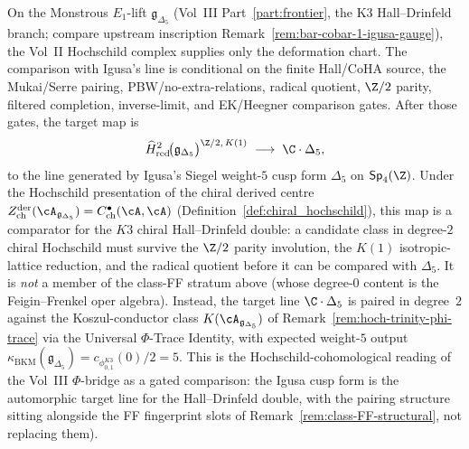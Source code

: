 \begin{remark}
\label{rem:hoch-igusa-gauge-class}
%
%
On the Monstrous $E_1$-lift
$\mathfrak{g}_{\Delta_5}$ (Vol~III Part~\ref{part:frontier},
the K3 Hall--Drinfeld branch; compare upstream inscription
Remark~\ref{rem:bar-cobar-1-igusa-gauge}), the Vol~II Hochschild
complex supplies only the deformation chart. The comparison with
Igusa's line is conditional on the finite Hall/CoHA source, the
Mukai/Serre pairing, PBW/no-extra-relations, radical quotient,
$\Z/2$ parity, filtered completion, inverse-limit, and EK/Heegner
comparison gates. After those gates, the target map is
\[
\widehat H^2_{\mathrm{red}}\!
  \bigl(\mathfrak{g}_{\Delta_5}\bigr)^{\Z/2,\,K(1)}
\;\longrightarrow\;
\C\cdot\Delta_5,
\]
to the line generated by Igusa's Siegel weight-$5$ cusp form
$\Delta_5$ on $\mathsf{Sp}_4(\Z)$. Under the Hochschild presentation
of the chiral derived centre
$Z^{\mathrm{der}}_{\mathrm{ch}}(\cA_{\mathfrak{g}_{\Delta_5}})
=C^\bullet_{\mathrm{ch}}(\cA,\cA)$
(Definition~\ref{def:chiral_hochschild}), this map is a comparator for
the $K3$ chiral Hall--Drinfeld double: a candidate class in
degree-$2$ chiral Hochschild must survive the $\Z/2$ parity involution,
the $K(1)$ isotropic-lattice reduction, and the radical quotient before
it can be compared with $\Delta_5$. It is \emph{not} a member of the
class-FF stratum above (whose degree-$0$ content is the
Feigin--Frenkel oper algebra). Instead, the target line
$\C\cdot\Delta_5$ is paired in degree~$2$ against the
Koszul-conductor class
$K(\cA_{\mathfrak{g}_{\Delta_5}})$ of
Remark~\ref{rem:hoch-trinity-phi-trace} via the Universal
$\Phi$-Trace Identity, with expected weight-$5$ output
$\kappa_{\mathrm{BKM}}(\mathfrak{g}_{\Delta_5})=c_{\phi_{0,1}^{K3}}(0)/2=5$.
This is the Hochschild-cohomological reading of the Vol~III
$\Phi$-bridge as a gated comparison: the Igusa cusp form is the
automorphic target line for the Hall--Drinfeld double, with the pairing
structure sitting alongside the FF fingerprint slots of
Remark~\ref{rem:class-FF-structural}, not replacing them).
\end{remark}

